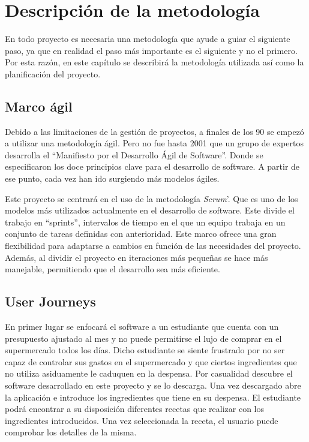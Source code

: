 \chapter{Descripción de la metodología}
En todo proyecto es necesaria una metodología que ayude a guiar el siguiente paso, ya que en realidad el paso más importante es el siguiente y no el primero. Por esta razón, en este capítulo se describirá la metodología utilizada así como la planificación del proyecto.

\section{Marco ágil}
Debido a las limitaciones de la gestión de proyectos, a finales de los 90 se empezó a utilizar una metodología ágil. Pero no fue hasta 2001 que un grupo de expertos desarrolla el ``Manifiesto por el Desarrollo Ágil de Software''. Donde se especificaron los doce principios clave para el desarrollo de software. A partir de ese punto, cada vez han ido surgiendo más modelos ágiles.

Este proyecto se centrará en el uso de la metodología \emph{Scrum}'. Que es uno de los modelos más utilizados actualmente en el desarrollo de software. Este divide el trabajo en ``sprints'', intervalos de tiempo en el que un equipo trabaja en un conjunto de tareas definidas con anterioridad. Este marco ofrece una gran flexibilidad para adaptarse a cambios en función de las necesidades del proyecto. Además, al dividir el proyecto en iteraciones más pequeñas se hace más manejable, permitiendo que el desarrollo sea más eficiente.

\section{User Journeys}

En primer lugar se enfocará el software a un estudiante que cuenta con un presupuesto ajustado al mes y no puede permitirse el lujo de comprar en el supermercado todos los días. Dicho estudiante se siente frustrado por no ser capaz de controlar sus gastos en el supermercado y que ciertos ingredientes que no utiliza asiduamente le caduquen en la despensa. Por casualidad descubre el software desarrollado en este proyecto y se lo descarga. Una vez descargado abre la aplicación e introduce los ingredientes que tiene en su despensa. El estudiante podrá encontrar a su disposición diferentes recetas que realizar con los ingredientes introducidos. Una vez seleccionada la receta, el usuario puede comprobar los detalles de la misma.

